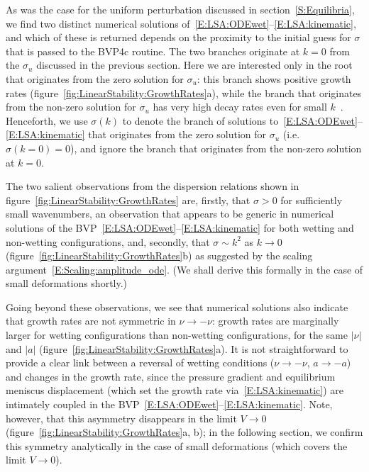 \documentclass{jfm}
\newcommand{\blue}[1]{{\color{blue} #1}}
\newcommand{\aspect}{a} %
\begin{document}
As was the case for the uniform perturbation discussed in section~\ref{S:Equilibria}, we find two distinct numerical solutions of~\eqref{E:LSA:ODEwet}--\eqref{E:LSA:kinematic}, and which of these is returned depends on the proximity to the initial guess for $\sigma$ that is passed to the BVP4c routine. The two branches originate at $k=0$ from the $\sigma_u$ discussed in the previous section. Here we are interested only in the root that originates from the zero solution for $\sigma_u$: this branch shows positive growth rates (figure~\ref{fig:LinearStability:GrowthRates}a), while the branch that originates from the non-zero solution for $\sigma_u$ has very high decay rates even for small $k$~\citep[not shown, but see Ch. 5 of][]{BradleyPhDthesis}. Henceforth, we use $\sigma(k)$ to denote the branch of solutions to~\eqref{E:LSA:ODEwet}--\eqref{E:LSA:kinematic} that originates from the zero solution for $\sigma_u$ (i.e. $\sigma(k=0) = 0$), and ignore the branch that originates from the non-zero solution at $k = 0$.


The two salient observations from the dispersion relations shown in figure~\ref{fig:LinearStability:GrowthRates} are, firstly, that $\sigma > 0$ for sufficiently small wavenumbers, an observation that appears to be generic in numerical solutions of the BVP~\eqref{E:LSA:ODEwet}--\eqref{E:LSA:kinematic} for both wetting and non-wetting configurations, and, secondly, that $\sigma\sim k^2$ as $k \to 0$ (figure~\ref{fig:LinearStability:GrowthRates}b) as suggested by the scaling argument~\eqref{E:Scaling:amplitude_ode}. (We shall derive this formally in the case of small deformations shortly.)

Going beyond these observations, we see that numerical solutions also indicate that growth rates are not symmetric in $\nu \to -\nu$: growth rates are marginally larger for wetting configurations than non-wetting configurations, for the same $|\nu|$ and $|\aspect|$ (figure~\ref{fig:LinearStability:GrowthRates}a). It is not straightforward to provide a clear link between a reversal of wetting conditions ($\nu \to -\nu$, $a \to -a$) and changes in the growth rate, since the pressure gradient and equilibrium meniscus displacement (which set the growth rate via~\eqref{E:LSA:kinematic}) are intimately coupled in the BVP~\eqref{E:LSA:ODEwet}--\eqref{E:LSA:kinematic}. Note, however, that this asymmetry disappears in the limit $V \to 0$ (figure~\ref{fig:LinearStability:GrowthRates}a, b); in the following section, we confirm this symmetry analytically in the case of small deformations (which covers the limit $V \to 0$).  %
\end{document}
